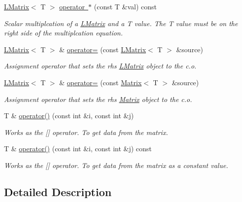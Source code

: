 \begin{DoxyCompactItemize}
\mbox{\hyperlink{class_l_matrix}{L\+Matrix}}$<$ T $>$ \mbox{\hyperlink{class_l_matrix_ac8df9082c434b41a98d26defb95ea388}{operator $\ast$}} (const T \&val) const
\begin{DoxyCompactList}\small\item\em Scalar multiplcation of a \mbox{\hyperlink{class_l_matrix}{L\+Matrix}} and a T value. The T value must be on the right side of the multiplcation equation. \end{DoxyCompactList}\item 
\mbox{\hyperlink{class_l_matrix}{L\+Matrix}}$<$ T $>$ \& \mbox{\hyperlink{class_l_matrix_ad4feb8e3706e9ce8fdb07e63d985f52f}{operator=}} (const \mbox{\hyperlink{class_l_matrix}{L\+Matrix}}$<$ T $>$ \&source)
\begin{DoxyCompactList}\small\item\em Assignment operator that sets the rhs \mbox{\hyperlink{class_l_matrix}{L\+Matrix}} object to the c.\+o. \end{DoxyCompactList}\item 
\mbox{\hyperlink{class_l_matrix}{L\+Matrix}}$<$ T $>$ \& \mbox{\hyperlink{class_l_matrix_a4417a98f81bcd9797241cf658b8ba400}{operator=}} (const \mbox{\hyperlink{class_matrix}{Matrix}}$<$ T $>$ \&source)
\begin{DoxyCompactList}\small\item\em Assignment operator that sets the rhs \mbox{\hyperlink{class_matrix}{Matrix}} object to the c.\+o. \end{DoxyCompactList}\item 
T \& \mbox{\hyperlink{class_l_matrix_aa0b1bc37d56538dbdd4fcb3b88dcc3ec}{operator()}} (const int \&i, const int \&j)
\begin{DoxyCompactList}\small\item\em Works as the \mbox{[}\mbox{]} operator. To get data from the matrix. \end{DoxyCompactList}\item 
T \& \mbox{\hyperlink{class_l_matrix_ae9d404d99117892edd2fbfddfaf929f5}{operator()}} (const int \&i, const int \&j) const
\begin{DoxyCompactList}\small\item\em Works as the \mbox{[}\mbox{]} operator. To get data from the matrix as a constant value. \end{DoxyCompactList}\end{DoxyCompactItemize}


\subsection{Detailed Description}
